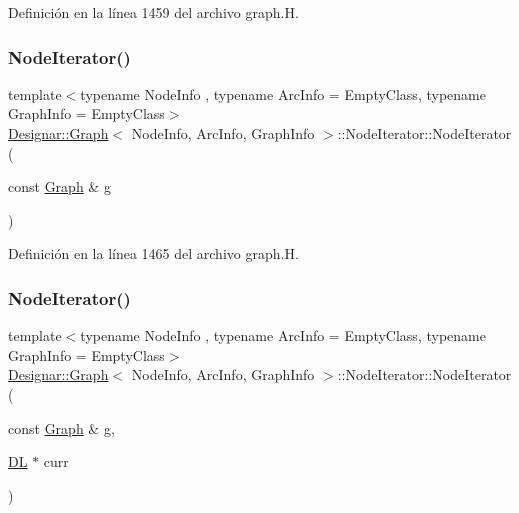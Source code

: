 Definición en la línea 1459 del archivo graph.\+H.

\mbox{\label{class_designar_1_1_graph_1_1_node_iterator_a646f28f9dbd99df7317dd0cf22122f42}} 
\subsubsection{\texorpdfstring{Node\+Iterator()}{NodeIterator()}\hspace{0.1cm}{\footnotesize\ttfamily [2/5]}}
{\footnotesize\ttfamily template$<$typename Node\+Info , typename Arc\+Info  = Empty\+Class, typename Graph\+Info  = Empty\+Class$>$ \\
\hyperlink{class_designar_1_1_graph}{Designar\+::\+Graph}$<$ Node\+Info, Arc\+Info, Graph\+Info $>$\+::Node\+Iterator\+::\+Node\+Iterator (\begin{DoxyParamCaption}\item[{const \hyperlink{class_designar_1_1_graph}{Graph} \&}]{g }\end{DoxyParamCaption})\hspace{0.3cm}{\ttfamily [inline]}}



Definición en la línea 1465 del archivo graph.\+H.

\mbox{\label{class_designar_1_1_graph_1_1_node_iterator_abc568563840c41429af62d925d45afc6}} 
\subsubsection{\texorpdfstring{Node\+Iterator()}{NodeIterator()}\hspace{0.1cm}{\footnotesize\ttfamily [3/5]}}
{\footnotesize\ttfamily template$<$typename Node\+Info , typename Arc\+Info  = Empty\+Class, typename Graph\+Info  = Empty\+Class$>$ \\
\hyperlink{class_designar_1_1_graph}{Designar\+::\+Graph}$<$ Node\+Info, Arc\+Info, Graph\+Info $>$\+::Node\+Iterator\+::\+Node\+Iterator (\begin{DoxyParamCaption}\item[{const \hyperlink{class_designar_1_1_graph}{Graph} \&}]{g,  }\item[{\hyperlink{class_designar_1_1_d_l}{DL} $\ast$}]{curr }\end{DoxyParamCaption})\hspace{0.3cm}{\ttfamily [inline]}}



